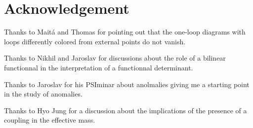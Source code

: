 \documentclass[10pt, a4paper]{article}
\begin{document}
\section{Acknowledgement}

Thanks to Maitá and Thomas for pointing out that the one-loop diagrams with loops differently colored from external points do not vanish. 

Thanks to Nikhil and Jaroslav for discussions about the role of a bilinear functionnal in the interpretation of a functionnal determinant. 

Thanks to Jaroslav for his PSIminar about anolmalies giving me a starting point in the study of anomalies. 

Thanks to Hyo Jung for a discussion about the implications of the presence of a coupling in the effective mass. 




\makereferences


\end{document}
